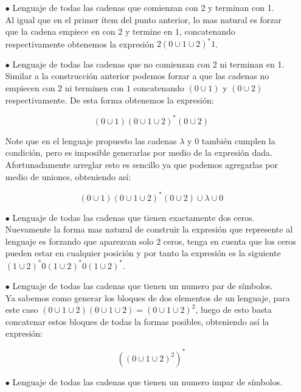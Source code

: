 \begin{itemize}
    \item[$\bullet$] Lenguaje de todas las cadenas que comienzan con 2 y terminan con 1.\\ 

    Al igual que en el primer ítem del punto anterior, lo mas natural es forzar que la cadena empiece en con $2$ y termine en $1$, concatenando respectivamente obtenemos la expresión $2(0\cup1\cup2)^*1$.

    \item[$\bullet$] Lenguaje de todas las cadenas que no comienzan con 2 ni terminan en 1.\\ 

    Similar a la construcción anterior podemos forzar a que las cadenas no empiecen con $2$ ni terminen con $1$ concatenando $(0\cup1)$ y $(0\cup2)$ respectivamente. De esta forma obtenemos la expresión:
    
    $$(0\cup1)(0\cup1\cup2)^*(0\cup2)$$

    Note que en el lenguaje propuesto las cadenas $\lambda$ y $0$ también cumplen la condición, pero es imposible generarlas por medio de la expresión dada. Afortunadamente arreglar esto es sencillo ya que podemos agregarlas por medio de uniones, obteniendo así:

    $$(0\cup1)(0\cup1\cup2)^*(0\cup2)\cup\lambda\cup0$$

    \item[$\bullet$] Lenguaje de todas las cadenas que tienen exactamente dos ceros.\\ 

    Nuevamente la forma mas natural de construir la expresión que represente al lenguaje es forzando que aparezcan solo $2$ ceros, tenga en cuenta que los ceros pueden estar en cualquier posición y por tanto la expresión es la siguiente $(1\cup2)^*0(1\cup2)^*0(1\cup2)^*$.

    \item[$\bullet$] Lenguaje de todas las cadenas que tienen un numero par de símbolos.\\

     Ya sabemos como generar los bloques de dos elementos de un lenguaje, para este caso $(0\cup1\cup2)(0\cup1\cup2)=(0\cup1\cup2)^2$, luego de esto basta concatenar estos bloques de todas la formas posibles, obteniendo así la expresión:

    $$\left((0\cup1\cup2)^2\right)^*$$

    \item[$\bullet$] Lenguaje de todas las cadenas que tienen un numero impar de símbolos.\\


\end{itemize}
